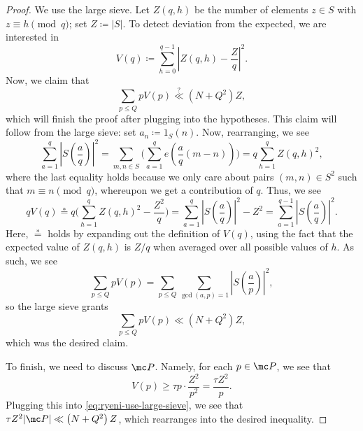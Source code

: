 \documentclass[../notes.tex]{subfiles}
\begin{document}
\begin{proof}
	We use the large sieve. Let $Z(q,h)$ be the number of elements $z\in S$ with $z\equiv h\pmod q$; set $Z\coloneqq|S|$. To detect deviation from the expected, we are interested in
	\[V(q)\coloneqq\sum_{h=0}^{q-1}\left|Z(q,h)-\frac Zq\right|^2.\]
	Now, we claim that
	\begin{equation}
		\sum_{p\le Q}pV(p)\stackrel?\ll\left(N+Q^2\right)Z, \label{eq:ryeni-use-large-sieve}
	\end{equation}
	which will finish the proof after plugging into the hypotheses. This claim will follow from the large sieve: set $a_n\coloneqq1_S(n)$. Now, rearranging, we see
	\[\sum_{a=1}^q\left|S\left(\frac aq\right)\right|^2=\sum_{m,n\in S}\Bigg(\sum_{a=1}^qe\left(\frac aq(m-n)\right)\Bigg)=q\sum_{h=1}^qZ(q,h)^2,\]
	where the last equality holds because we only care about pairs $(m,n)\in S^2$ such that $m\equiv n\pmod q$, whereupon we get a contribution of $q$. Thus, we see
	\[qV(q)\stackrel*=q\Bigg(\sum_{h=1}^qZ(q,h)^2-\frac{Z^2}q\Bigg)=\sum_{a=1}^q\left|S\left(\frac aq\right)\right|^2-Z^2=\sum_{a=1}^{q-1}\left|S\left(\frac aq\right)\right|^2.\]
	Here, $\stackrel*=$ holds by expanding out the definition of $V(q)$, using the fact that the expected value of $Z(q,h)$ is $Z/q$ when averaged over all possible values of $h$. As such, we see
	\[\sum_{p\le Q}pV(p)=\sum_{p\le Q}\sum_{\gcd(a,p)=1}\left|S\left(\frac ap\right)\right|^2,\]
	so the large sieve grants
	\[\sum_{p\le Q}pV(p)\ll\left(N+Q^2\right)Z,\]
	which was the desired claim.

	To finish, we need to discuss $\mc P$. Namely, for each $p\in\mc P$, we see that
	\[V(p)\ge\tau p\cdot\frac{Z^2}{p^2}=\frac{\tau Z^2}p.\]
	Plugging this into \eqref{eq:ryeni-use-large-sieve}, we see that $\tau Z^2|\mc P|\ll\left(N+Q^2\right)Z$, which rearranges into the desired inequality.
\end{proof}
\end{document}

